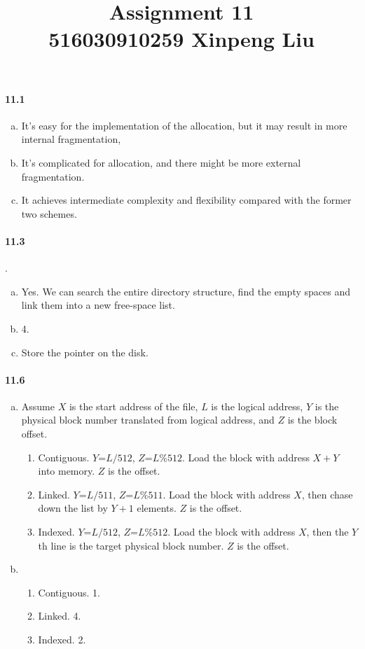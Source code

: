 \documentclass[12pt,a4]{article}
\date{}
\title{
	Assignment 11\\
	\vspace{3mm}
	{\normalsize 516030910259 \textbf{Xinpeng Liu}}
}
\begin{document}
	\maketitle
	\paragraph{11.1} 
		\begin{enumerate}[a.]
			\item It's easy for the implementation of the allocation, but it may result in more internal fragmentation, 
			\item It's complicated for allocation, and there might be more external fragmentation.
			\item It achieves intermediate complexity and flexibility compared with the former two schemes.
		\end{enumerate}
	\paragraph{11.3}.
		\begin{enumerate}[a.]
			\item Yes. We can search the entire directory structure, find the empty spaces and link them into a new free-space list.
			\item 4.
			\item Store the pointer on the disk.
		\end{enumerate}
	\paragraph{11.6}
		\begin{enumerate}[a.]
			\item Assume $X$ is the start address of the file, $L$ is the logical address, $Y$ is the physical block number translated from logical address, and $Z$ is the block offset.
				\begin{enumerate}
					\item Contiguous. $Y$=$L/512$, $Z$=$L\%512$. Load the block with address $X+Y$ into memory. $Z$ is the offset.
					\item Linked. $Y$=$L/511$, $Z$=$L\%511$. Load the block with address $X$, then chase down the list by $Y+1$ elements. $Z$ is the offset.
					\item Indexed. $Y$=$L/512$, $Z$=$L\%512$. Load the block with address $X$, then the $Y$th line is the target physical block number. $Z$ is the offset.
				\end{enumerate}
			\item 
			\begin{enumerate}
					\item Contiguous. 1.
					\item Linked. 4.
					\item Indexed. 2.
				\end{enumerate}
		\end{enumerate}
\end{document}
